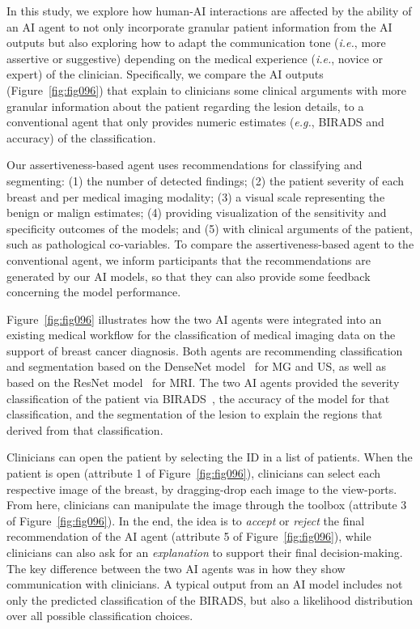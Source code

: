 In this study, we explore how human-AI interactions are affected by the ability of an AI agent to not only incorporate granular patient information from the AI outputs but also exploring how to adapt the communication tone ({\it i.e.}, more assertive or suggestive) depending on the medical experience ({\it i.e.}, novice or expert) of the clinician.
Specifically, we compare the AI outputs (Figure~\ref{fig:fig096}) that explain to clinicians some clinical arguments with more granular information about the patient regarding the lesion details, to a conventional agent that only provides numeric estimates ({\it e.g.}, BIRADS and accuracy) of the classification.

Our assertiveness-based agent uses recommendations for classifying and segmenting:
(1) the number of detected findings;
(2) the patient severity of each breast and per medical imaging modality;
(3) a visual scale representing the benign or malign estimates;
(4) providing visualization of the sensitivity and specificity outcomes of the models; and
(5) with clinical arguments of the patient, such as pathological co-variables.
To compare the assertiveness-based agent to the conventional agent, we inform participants that the recommendations are generated by our AI models, so that they can also provide some feedback concerning the model performance.

Figure~\ref{fig:fig096} illustrates how the two AI agents were integrated into an existing medical workflow for the classification of medical imaging data on the support of breast cancer diagnosis.
Both agents are recommending classification and segmentation based on the DenseNet model~\cite{8721151} for MG and US, as well as based on the ResNet model~\cite{TALO2019101673} for MRI.
The two AI agents provided the severity classification of the patient via BIRADS~\cite{SPAK2017179}, the accuracy of the model for that classification, and the segmentation of the lesion to explain the regions that derived from that classification.

Clinicians can open the patient by selecting the ID in a list of patients.
When the patient is open (attribute 1 of Figure~\ref{fig:fig096}), clinicians can select each respective image of the breast, by dragging-drop each image to the view-ports.
From here, clinicians can manipulate the image through the toolbox (attribute 3 of Figure~\ref{fig:fig096}).
In the end, the idea is to {\it accept} or {\it reject} the final recommendation of the AI agent (attribute 5 of Figure~\ref{fig:fig096}), while clinicians can also ask for an {\it explanation} to support their final decision-making.
The key difference between the two AI agents was in how they show communication with clinicians.
A typical output from an AI model includes not only the predicted classification of the BIRADS, but also a likelihood distribution over all possible classification choices.

